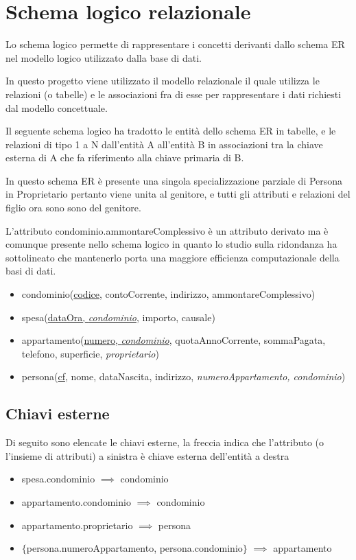 \section{Schema logico relazionale}

Lo schema logico permette di rappresentare i concetti derivanti dallo schema ER
nel modello logico utilizzato dalla base di dati.

In questo progetto viene utilizzato il modello relazionale il quale utilizza le relazioni
(o tabelle) e le associazioni fra di esse per rappresentare i dati richiesti dal modello
concettuale.

Il seguente schema logico ha tradotto le entità dello schema ER in tabelle, e le relazioni
di tipo 1 a N dall'entità A all'entità B in associazioni tra la chiave esterna di A che
fa riferimento alla chiave primaria di B.

In questo schema ER è presente una singola specializzazione parziale di Persona in
Proprietario pertanto viene unita al genitore, e tutti gli attributi e relazioni del figlio
ora sono sono del genitore.

L'attributo condominio.ammontareComplessivo è un attributo derivato ma è comunque presente
nello schema logico in quanto lo studio sulla ridondanza ha sottolineato che mantenerlo porta
una maggiore efficienza computazionale della basi di dati.

\begin{itemize}

\item condominio(\underline{codice}, contoCorrente, indirizzo, ammontareComplessivo)

\item spesa(\underline{dataOra, \textit{condominio}}, importo, causale)

\item appartamento(\underline{numero, \textit{condominio}}, quotaAnnoCorrente, sommaPagata, telefono, superficie, \textit{proprietario})

\item persona(\underline{cf}, nome, dataNascita, indirizzo, \textit{numeroAppartamento, condominio})

\end{itemize}

\subsection{Chiavi esterne}

Di seguito sono elencate le chiavi esterne, la freccia indica che l'attributo (o l'insieme di attributi)
a sinistra è chiave esterna dell'entità a destra


\begin{itemize}
	\item spesa.condominio $\implies$ condominio
	\item appartamento.condominio $\implies$ condominio
	\item appartamento.proprietario $\implies$ persona
	\item $\{$persona.numeroAppartamento, persona.condominio$\}$ $\implies$ appartamento
\end{itemize}

